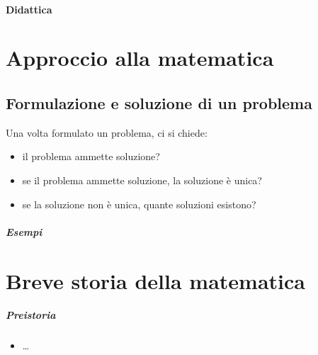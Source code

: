 \subsubsection{Didattica}



\chapter{Approccio alla matematica}
\section{Formulazione e soluzione di un problema}
Una volta formulato un problema, ci si chiede:
\begin{itemize}
    \item il problema ammette soluzione?
    \item se il problema ammette soluzione, la soluzione è unica?
    \item se la soluzione non è unica, quante soluzioni esistono?
\end{itemize}

\paragraph{Esempi}


\chapter{Breve storia della matematica}
\paragraph{Preistoria}
\begin{itemize}
  \item \dots
\end{itemize}
